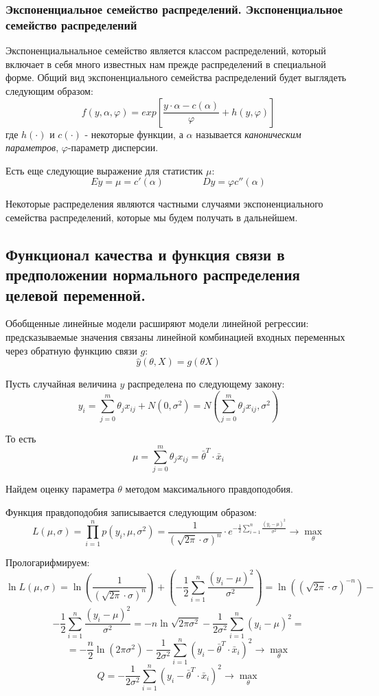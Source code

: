 \documentclass[aps,%
12pt,%
final,%
oneside,
onecolumn,%
musixtex, %
superscriptaddress,%
centertags]{article} %
\theoremstyle{plain}
\theoremstyle{definition}
\theoremstyle{remark}
\begin{document}
\subsubsection{Экспоненциальное семейство распределений. Экспоненциальное семейство распределений}

Экспоненциальнальное семейство является классом распределений, который включает в себя много известных нам прежде распределений в специальной форме. Общий вид экспоненциального семейства распределений будет выглядеть следующим образом:
$$f(y,\alpha,\varphi) = exp \left[\frac{y\cdot \alpha - c(\alpha)}{\varphi} + h(y,\varphi) \right]$$
где $h(\cdot)$ и $c(\cdot)$ - некоторые функции, а $\alpha$ называется \textit{каноническим параметров}, $\varphi$-параметр дисперсии.

Есть еще следующие выражение для статистик $\mu$:
$$Ey = \mu = c'(\alpha) \qquad  \qquad Dy = \varphi c''(\alpha)$$

Некоторые распределения являются частными случаями экспоненциального семейства распределений, которые мы будем получать в дальнейшем.

\newpage
\subsection{Функционал качества и функция связи в предположении нормального распределения целевой переменной.}

Обобщенные линейные модели расширяют модели линейной регрессии: предсказываемые значения связаны линейной комбинацией входных переменных через обратную функцию связи $g$:
$$\hat{y}(\theta,X) = g(\theta X)$$

Пусть случайная величина $y$ распределена по следующему закону:
$$y_i = \sum_{j=0}^m \theta_j x_{ij}+ N(0,\sigma^2) = N(\sum_{j=0}^m \theta_j x_{ij},\sigma^2)$$

То есть $$\mu  = \sum_{j=0}^m \theta_j x_{ij} = \left .\bar{\theta}\right .^T \cdot \bar{x}_i $$

Найдем оценку параметра $\theta$ методом максимального правдоподобия.

Функция правдоподобия записывается следующим образом:
$$L(\mu,\sigma) = \prod_{i=1}^n p(y_i,\mu,\sigma^2) = \frac{1}{(\sqrt{2\pi}\cdot \sigma)^n} \cdot e^{-\frac{1}{2}\sum\limits_{i=1}^n \frac{(y_i - \mu)^2}{\sigma^2}} \to \underset{\theta}{\max}$$

Прологарифмируем:
$$\ln L(\mu,\sigma) = \ln \left(\frac{1}{(\sqrt{2\pi}\cdot \sigma)^n}\right) + \left(-\frac{1}{2}\sum\limits_{i=1}^n \frac{(y_i - \mu)^2}{\sigma^2}\right)  =  \ln \left((\sqrt{2\pi}\cdot \sigma)^{-n}\right) -$$
$$ -\frac{1}{2}\sum\limits_{i=1}^n \frac{(y_i - \mu)^2}{\sigma^2}  = -n \ln \sqrt{2\pi\sigma^2} - \frac{1}{2\sigma^2}\sum\limits_{i=1}^n (y_i - \mu)^2  = $$
$$ = -\frac{n}{2} \ln (2\pi\sigma^2) -\frac{1}{2\sigma^2}\sum\limits_{i=1}^n (y_i -  \left .\bar{\theta}\right .^T \cdot \bar{x}_i)^2  \to \underset{\theta}{\max} $$
$$Q = - \frac{1}{2\sigma^2}\sum\limits_{i=1}^n (y_i -  \left .\bar{\theta}\right .^T \cdot \bar{x}_i)^2  \to \underset{\theta}{\max}$$
\end{document}
